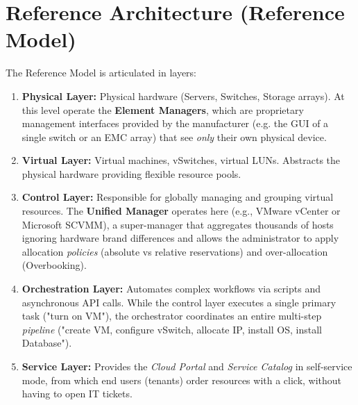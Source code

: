 \section{Reference Architecture (Reference Model)}
The Reference Model is articulated in layers:
\begin{enumerate}
    \item \textbf{Physical Layer:} Physical hardware (Servers, Switches, Storage arrays). At this level operate the \textbf{Element Managers}, which are proprietary management interfaces provided by the manufacturer (e.g. the GUI of a single switch or an EMC array) that see \textit{only} their own physical device.
    \item \textbf{Virtual Layer:} Virtual machines, vSwitches, virtual LUNs. Abstracts the physical hardware providing flexible resource pools.
    \item \textbf{Control Layer:} Responsible for globally managing and grouping virtual resources. The \textbf{Unified Manager} operates here (e.g., VMware vCenter or Microsoft SCVMM), a super-manager that aggregates thousands of hosts ignoring hardware brand differences and allows the administrator to apply allocation \textit{policies} (absolute vs relative reservations) and over-allocation (Overbooking).
    \item \textbf{Orchestration Layer:} Automates complex workflows via scripts and asynchronous API calls. While the control layer executes a single primary task ("turn on VM"), the orchestrator coordinates an entire multi-step \textit{pipeline} ("create VM, configure vSwitch, allocate IP, install OS, install Database").
    \item \textbf{Service Layer:} Provides the \textit{Cloud Portal} and \textit{Service Catalog} in self-service mode, from which end users (tenants) order resources with a click, without having to open IT tickets.
\end{enumerate}

